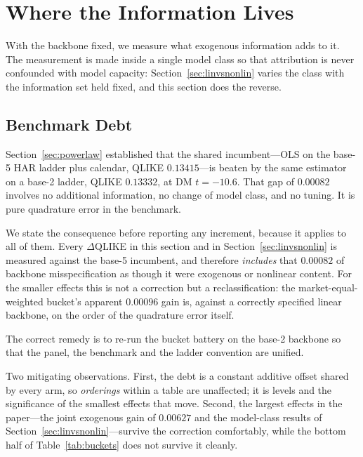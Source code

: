 \section{Where the Information Lives}
\label{sec:marginal}

With the backbone fixed, we measure what exogenous information adds to it. The
measurement is made inside a single model class so that attribution is never
confounded with model capacity: Section~\ref{sec:linvsnonlin} varies the class
with the information set held fixed, and this section does the reverse.

\subsection{Benchmark Debt}
\label{sec:benchmark_debt}

Section~\ref{sec:powerlaw} established that the shared incumbent---OLS on the
base-5 HAR ladder plus calendar, QLIKE $0.13415$---is beaten by the same
estimator on a base-2 ladder, QLIKE $0.13332$, at DM $t = -10.6$. That gap of
$0.00082$ involves no additional information, no change of model class, and no
tuning. It is pure quadrature error in the benchmark.

We state the consequence before reporting any increment, because it applies to
all of them. Every $\Delta$QLIKE in this section and in
Section~\ref{sec:linvsnonlin} is measured against the base-5 incumbent, and
therefore \emph{includes} that $0.00082$ of backbone misspecification as though
it were exogenous or nonlinear content. For the smaller effects this is not a
correction but a reclassification: the market-equal-weighted bucket's apparent
$0.00096$ gain is, against a correctly specified linear backbone, on the order
of the quadrature error itself.

The correct remedy is to re-run the bucket battery on the base-2 backbone so
that the panel, the benchmark and the ladder convention are unified.

Two mitigating observations. First, the debt is a constant additive offset
shared by every arm, so \emph{orderings} within a table are unaffected; it is
levels and the significance of the smallest effects that move. Second, the
largest effects in the paper---the joint exogenous gain of $0.00627$ and the
model-class results of Section~\ref{sec:linvsnonlin}---survive the correction
comfortably, while the bottom half of Table~\ref{tab:buckets} does not survive
it cleanly.

